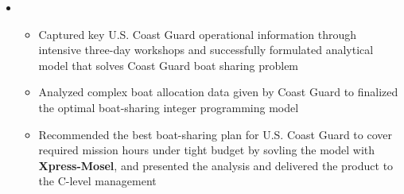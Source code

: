 \documentclass[11pt,a4paper,sans]{moderncv}        %
\begin{document}
\begin{itemize}
	\vspace{6pt}

	\item{
		{\vspace{3pt}
			\begin{itemize}
				\item Captured key U.S. Coast Guard operational information through intensive three-day workshops and successfully formulated analytical model that solves Coast Guard boat sharing problem
				\item Analyzed complex boat allocation data given by Coast Guard to finalized the optimal boat-sharing integer programming model %
				\item Recommended the best boat-sharing plan for U.S. Coast Guard to cover required mission hours under tight budget by sovling the model with \textbf{Xpress-Mosel}, and presented the analysis and delivered the product to the C-level management %
			\end{itemize}}}

	\vspace{6pt}


\end{itemize}
\end{document}
